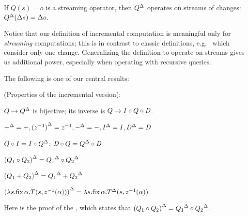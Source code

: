 \begin{center}
\end{center}
If $Q(s) = o$ is a streaming operator, then ${Q}^{\Delta}$ operates on
streams of changes: ${Q}^{\Delta}(\Delta s) = \Delta o$.

Notice that our definition of incremental computation is meaningful only for \emph{streaming}
computations; this is in contrast to classic definitions, e.g.~\cite{gupta-idb95} which
consider only one change.  Generalizing the definition to operate on streams gives us
additional power, especially when operating with recursive queries.

The following is one of our central results:

\begin{proposition}(Properties of the incremental version):
\label{prop-inc-properties}
\begin{description}[nosep, leftmargin=\parindent]
\item[inversion:] $Q\mapsto{Q}^{\Delta}$ is bijective; its inverse is $Q\mapsto \mathit{I}\circ Q\circ\mathit{D}$.
\item[invariance:] ${+}^{\Delta} = +, {(z^{-1})}^{\Delta} = z^{-1}, {-}^{\Delta} = -, {\mathit{I}}^{\Delta}=\mathit{I}, {\mathit{D}}^{\Delta}=\mathit{D}$
\item[push/pull:] \label{prop-part-commutation}
    $Q \circ \mathit{I} = \mathit{I} \circ {Q}^{\Delta}$; $\mathit{D}\circ Q = {Q}^{\Delta}\circ\mathit{D}$
\item[chain:] ${(Q_1\circ Q_2)}^{\Delta} = {Q_1}^{\Delta}\circ{Q_2}^{\Delta}$
\item[add:] ${(Q_1 + Q_2)}^{\Delta} = {Q_1}^{\Delta} + {Q_2}^{\Delta}$
\item[cycle:] ${(\lambda s. \mbox{fix}\,\alpha.T(s,z^{-1}(\alpha)))}^{\Delta} = \lambda s. \mbox{fix}\,\alpha.{T}^{\Delta}(s,z^{-1}(\alpha))$
\end{description}
\end{proposition}

Here is the proof of the , which states that
${(Q_1 \circ Q_2)}^{\Delta} = {Q_1}^{\Delta} \circ {Q_2}^{\Delta}$.

